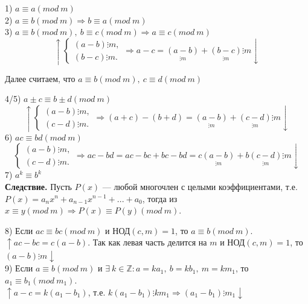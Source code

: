 \documentclass{article}
\begin{document}
            1) \( a \equiv a (mod\ m) \)\\
            2) \( a \equiv b (mod\ m) \Rightarrow b \equiv a (mod\ m) \)\\
            3) \( a \equiv b (mod\ m),\ b \equiv c (mod\ m) \Rightarrow a \equiv c (mod\ m) \)
            \[ \uparrow
                \begin{cases}
                    (a - b) \vdots m,\\
                    (b - c) \vdots m.
                \end{cases} \Rightarrow a - c = \underset{\vdots m}{(a - b)} + \underset{\vdots m}{(b - c)} \vdots m \downarrow \]
            \centerline{Далее считаем, что \( a \equiv b (mod\ m),\ c \equiv d (mod\ m) \)}
            4/5) \( a \pm c \equiv b \pm d (mod\ m) \)
            \[ \uparrow
                \begin{cases}
                    (a - b) \vdots m,\\
                    (c - d) \vdots m.
                \end{cases}
            \Rightarrow (a + c) - (b + d) = \underset{\vdots m}{(a - b)} + \underset{\vdots m}{(c - d)} \vdots m \downarrow \]
            6) \( ac \equiv bd (mod\ m) \) 
            \[ 
                \begin{cases}
                    (a - b) \vdots m,\\
                    (c - d) \vdots m.
                \end{cases}
            \Rightarrow ac - bd = ac - bc + bc - bd = c\underset{\vdots m}{(a - b)} + b\underset{\vdots m}{(c - d)} \vdots m \downarrow \]
            7) \( a^k \equiv b^k \)\\
            \textbf{Следствие.} Пусть \(P(x)\) --- любой многочлен с целыми коэффициентами, т.е. \(P(x) = a_nx^n + a_{n - 1}x^{n - 1} + ... + a_0\), тогда из \(x \equiv y (mod\ m) \Rightarrow P(x) \equiv P(y) (mod\ m)\).

            8) Если \(ac \equiv bc (mod\ m)\) и \(\textrm{НОД}(c,m) = 1\), то \(a \equiv b (mod\ m)\).\\
            \(\uparrow ac - bc = c(a - b)\). Так как левая часть делится на \(m\) и \(\textrm{НОД}(c,m) = 1\), то \((a - b) \vdots m \downarrow \)\\
            9) Если \(a \equiv b (mod\ m)\) и \(\exists\ k \in \mathbb{Z}: a = ka_1,\ b = kb_1,\ m = km_1\), то \(a_1 \equiv b_1 (mod\ m_1)\).\\
            \( \uparrow a - c = k(a_1 - b_1) \), т.е. \( k(a_1 - b_1) \vdots km_1 \Rightarrow (a_1 - b_1) \vdots m_1 \downarrow \)
\end{document}
